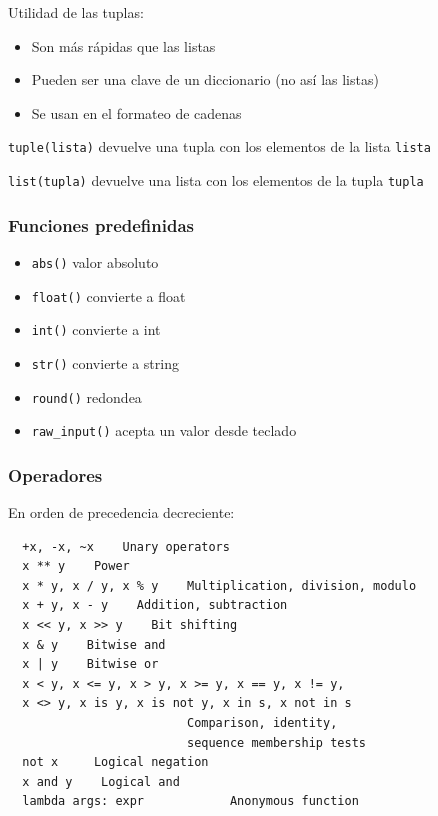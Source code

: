 \documentclass{beamer}
\begin{document}
\begin{frame}[fragile]

Utilidad de las tuplas:
\begin{itemize}
\item Son más rápidas que las listas
\item Pueden ser una clave de un diccionario (no así las listas)
\item Se usan en el formateo de cadenas
\end{itemize} 

\verb|tuple(lista)| devuelve una tupla con los elementos de la lista \verb|lista|

\verb|list(tupla)| devuelve una lista con los elementos de la tupla \verb|tupla|

\end{frame} 





\begin{frame}[fragile]
\frametitle{Funciones predefinidas}  
\begin{itemize}
  
\item 
\verb|abs()|   valor absoluto
\item 
\verb|float()|  convierte a float
\item 
\verb|int()|  convierte a int
\item 
\verb|str()|  convierte a string
\item 
\verb|round()|  redondea
\item 
\verb|raw_input()|  acepta un valor desde teclado


\end{itemize}
\end{frame}




\begin{frame}[fragile]
  \begin{center}
\frametitle{Operadores }
En orden de precedencia decreciente:
  \end{center}
  

  \begin{footnotesize}
\begin{verbatim}
  +x, -x, ~x    Unary operators
  x ** y    Power 
  x * y, x / y, x % y    Multiplication, division, modulo
  x + y, x - y    Addition, subtraction
  x << y, x >> y    Bit shifting
  x & y    Bitwise and
  x | y    Bitwise or
  x < y, x <= y, x > y, x >= y, x == y, x != y,
  x <> y, x is y, x is not y, x in s, x not in s  
                         Comparison, identity, 
                         sequence membership tests
  not x     Logical negation
  x and y    Logical and
  lambda args: expr            Anonymous function
\end{verbatim}
  \end{footnotesize}

\end{frame}
\end{document}
